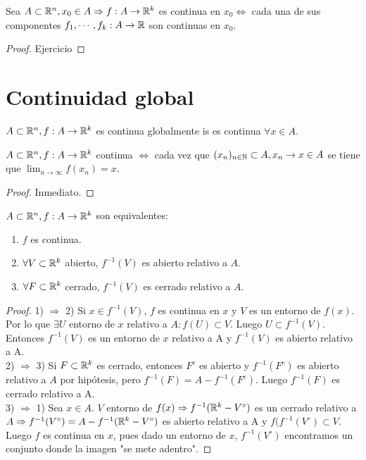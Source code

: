 \begin{prop}
  Sea \(A \subset \mathbb{R}^n, x_0 \in A \Rightarrow f: A \to \mathbb{R}^k\) es continua en \(x_0 \iff\) cada una de sus componentes \(f_1, \cdots, f_k: A \to \mathbb{R}\) son continuas en \(x_0\).
  \begin{proof}
    Ejercicio
  \end{proof}
\end{prop}

\section{Continuidad global}

\begin{definition}
  \(A \subset \mathbb{R}^n, f: A \to \mathbb{R}^k\) es continua globalmente is es continua \(\forall x \in A\).
\end{definition}

\begin{prop}
  \(A \subset \mathbb{R}^n, f: A \to \mathbb{R}^k\) continua \(\iff\) cada vez que \((x_n)_{n \in \mathbb{N}} \subset A, x_n \to x \in A\) se tiene que \(\lim_{n \to \infty} f(x_n) = x\).
  \begin{proof}
    Inmediato.
  \end{proof}
\end{prop}

\begin{prop}
  \(A \subset \mathbb{R}^n, f: A \to \mathbb{R}^k\) son equivalentes:
  \begin{enumerate}
    \item \(f\) es continua.
    \item \(\forall V \subset \mathbb{R}^k\) abierto, \(f^{-1}(V)\) es abierto relativo a \(A\).
    \item \(\forall F \subset \mathbb{R}^k\) cerrado, \(f^{-1}(V)\) es cerrado relativo a \(A\).
  \end{enumerate}
  \begin{proof}
    1) \(\Rightarrow\) 2)  Si \(x \in f^{-1}(V)\), \(f\) es continua en \(x\) y \(V\) es un entorno de \(f(x)\). Por lo que \(\exists U\) entorno de \(x\) relativo a \(A : f(U) \subset V\). Luego \(U \subset f^{-1}(V)\). Entonces \(f^{-1}(V)\) es un entorno de \(x\) relativo a A y \(f^{-1}(V)\) es abierto relativo a A. \\
    2) \(\Rightarrow\) 3) Si \(F \subset \mathbb{R}^k\) es cerrado, entonces \(F^c\) es abierto y \(f^{-1}(F^c)\) es abierto relativo a \(A\) por hipótesis, pero \(f^{-1}(F) = A - f^{-1}(F^c)\). Luego \(f^{-1}(F)\) es cerrado relativo a A. \\
    3) \(\Rightarrow\) 1) Sea \(x \in A\). \(V\) entorno de \(f(x) \Rightarrow f^{-1}(\mathbb{R}^k - V^{\circ})\) es un cerrado relativo a \(A \Rightarrow f^{-1}(V^{\circ}) = A - f^{-1}(\mathbb{R}^k - V^{\circ})\) es abierto relativo a A y \(f(f^{-1}(V^{\circ}) \subset V\). Luego \(f\) es continua en \(x\), pues dado un entorno de \(x\), \(f^{-1}(V^{\circ})\) encontramos un conjunto donde la imagen "se mete adentro".
  \end{proof}
\end{prop}

